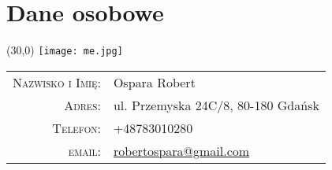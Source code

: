 \documentclass[a4paper,10pt]{article}
\begin{document}
	\par{\bigskip\par}
	
	\section{Dane osobowe}
	\begin{textblock}{1}(30,0)
        \texttt{[image: me.jpg]}
        \end{textblock}
	\begin{tabular}{rl}
		\textsc{Nazwisko i Imię:} & Ospara Robert \\
		\textsc{Adres:} & ul. Przemyska 24C/8, 80-180 Gdańsk \\
		\textsc{Telefon:} & +48783010280 \\
		\textsc{email:} & \href{mailto:robertospara@gmail.com}{robertospara@gmail.com}
	\end{tabular}
		
\end{document}
